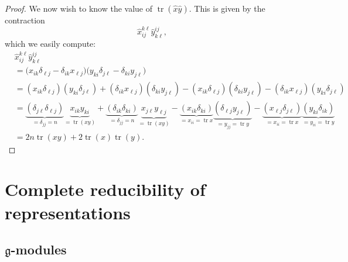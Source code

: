 \documentclass{article}
\DeclareMathOperator{\tr}{tr}
\newcommand*\frkg{{\ensuremath{\mathfrak{g}}}}
\begin{document}
\begin{proof}
    We now wish to know the value of $\tr (\hat{x} \hat{y})$.
    This is given by the contraction
    \[
        \hat{x}_{ij}^{k\ell}\hat{y}_{k\ell}^{ij},
    \]
    which we easily compute:
    \begin{align*}
        &\hat{x}_{ij}^{k\ell}\hat{y}_{k\ell}^{ij}
        \\
        &=
        \Big(
            x_{ik}\delta_{\ell j}
            -
            \delta_{ik}x_{\ell j}
        \Big)
        \Big(
            y_{ki}\delta_{j\ell}
            -
            \delta_{ki}y_{j\ell}
        \Big)
        \\
        &=
        (x_{ik}\delta_{\ell j})(y_{ki}\delta_{j\ell})
        +
        (\delta_{ik}x_{\ell j})(\delta_{ki}y_{j\ell})
        -
        (x_{ik}\delta_{\ell j})(\delta_{ki}y_{j\ell})
        -
        (\delta_{ik}x_{\ell j})(y_{ki}\delta_{j \ell})
        \\
        &=
        \underbrace{
            (\delta_{j\ell}\delta_{\ell j})
        }_{=\delta_{jj}=n}
        \underbrace{
            x_{ik}y_{ki}
        }_{=\tr(xy)}
        +
        \underbrace{
            (\delta_{ik}\delta_{ki})
        }_{=\delta_{jj}=n}
        \underbrace{
            x_{j\ell}y_{\ell j}
        }_{=\tr(xy)}
        -
        \underbrace{
            (x_{ik}\delta_{ki})
        }_{=x_{ii}=\tr x}
        \underbrace{
            (\delta_{\ell j}y_{j\ell})
        }_{=y_{jj}=\tr y}
        -
        \underbrace{
            (x_{\ell j}\delta_{j\ell})
        }_{=x_{ii}=\tr x}
        \underbrace{
            (y_{ki}\delta_{ik})
        }_{=y_{ii}=\tr y}
        \\
        &=
        2n\tr(xy) + 2\tr(x)\tr(y).
    \end{align*}
\end{proof}

\section{Complete reducibility of representations \cite[\S 6]{Hum72}}
\subsection{\texorpdfstring{$\frkg$}{g}-modules}
\end{document}
